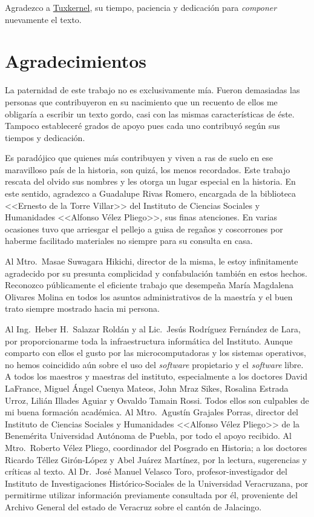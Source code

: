 \documentclass[14pt,twoside,final]{extbook} %
\begin{document}
Agradezco a \href{muxkernel@gmail.com}{Tuxkernel}, su tiempo, paciencia y dedicación para \emph{componer} nuevamente el texto.
\chapter*{Agradecimientos}\label{ch:agradecimientos}
\thispagestyle{empty}
\pagestyle{fancy}
\fancyhf{} %
\fancyhead[LE,RO]{\thepage}
\renewcommand{\headrulewidth}{0pt}
\setcounter{page}{7}
La paternidad de este trabajo no es exclusivamente mía. Fueron demasiadas las personas que contribuyeron en su nacimiento que un recuento de ellos me obligaría a escribir un texto gordo, casi con las mismas características de éste. Tampoco estableceré grados de apoyo pues cada uno contribuyó según sus tiempos y dedicación.

Es paradójico que quienes más contribuyen y viven a ras de suelo en ese maravilloso país de la historia, son quizá, los menos recordados. Este trabajo rescata del olvido sus nombres y les otorga un lugar especial en la historia. En este sentido, agradezco a Guadalupe Rivas Romero, encargada de la biblioteca <<Ernesto de la Torre Villar>> del Instituto de Ciencias Sociales y Humanidades <<Alfonso Vélez Pliego>>, sus finas atenciones. En varias ocasiones tuvo que arriesgar el pellejo a guisa de regaños y coscorrones por haberme facilitado materiales no siempre para su consulta en casa.

Al Mtro.~Masae Suwagara Hikichi, director de la misma, le estoy infinitamente agradecido por su presunta complicidad y confabulación también en estos hechos. Reconozco públicamente el eficiente trabajo que desempeña María Magdalena Olivares Molina en todos los asuntos administrativos de la maestría y el buen trato siempre mostrado hacia mi persona.

Al Ing.~Heber H.~Salazar Roldán y al Lic.~Jesús Rodríguez Fernández de Lara, por proporcionarme toda la infraestructura informática del Instituto. Aunque comparto con ellos el gusto por las microcomputadoras y los sistemas operativos, no hemos coincidido aún sobre el uso del \emph{software} propietario y el \emph{software} libre. A todos los maestros y maestras del instituto, especialmente a los doctores David LaFrance, Miguel Ángel Cuenya Mateos, John Mraz Sikes, Rosalina Estrada Urroz, Lilián Illades Aguiar y Osvaldo Tamain Rossi. Todos ellos son culpables de mi buena formación académica. Al Mtro.~Agustín Grajales Porras, director del Instituto de Ciencias Sociales y Humanidades <<Alfonso Vélez Pliego>> de la Benemérita Universidad Autónoma de Puebla, por todo el apoyo recibido. Al Mtro.~Roberto Vélez Pliego, coordinador del Posgrado en Historia; a los doctores Ricardo Téllez Girón-López y Abel Juárez Martínez, por la lectura, sugerencias y críticas al texto. Al Dr.~José Manuel Velasco Toro, profesor-investigador del Instituto de Investigaciones Histórico-Sociales de la Universidad Veracruzana, por permitirme utilizar información previamente consultada por él, proveniente del Archivo General del estado de Veracruz sobre el cantón de Jalacingo.
\end{document}

